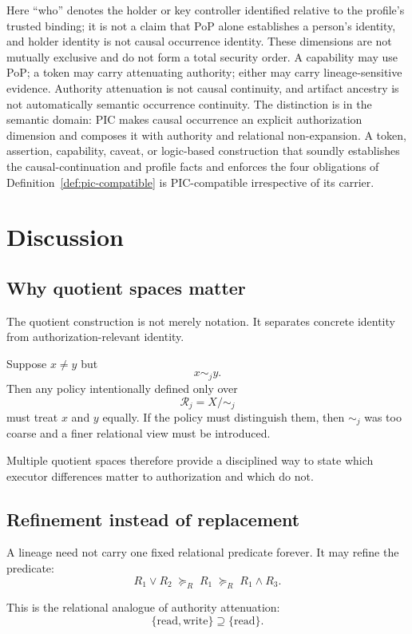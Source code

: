 \documentclass[10pt,twocolumn]{article}
\newcommand{\Rel}{\mathcal{R}}
\begin{document}
Here ``who'' denotes the holder or key controller identified relative to the
profile's trusted binding; it is not a claim that PoP alone establishes a
person's identity, and holder identity is not causal occurrence identity.
These dimensions are not mutually exclusive and do not form a total security
order. A capability may use PoP; a token may carry attenuating authority; either
may carry lineage-sensitive evidence. Authority attenuation is not causal
continuity, and artifact ancestry is not automatically semantic occurrence
continuity. The distinction is in the
semantic domain: PIC makes causal occurrence an explicit authorization
dimension and composes it with authority and relational non-expansion. A token,
assertion, capability, caveat, or logic-based construction that soundly
establishes the causal-continuation and profile facts and enforces the four
obligations of Definition~\ref{def:pic-compatible} is PIC-compatible
irrespective of its carrier.

\section{Discussion}

\subsection{Why quotient spaces matter}

The quotient construction is not merely notation. It separates concrete
identity from authorization-relevant identity.

Suppose \(x\neq y\) but
\[
x\sim_j y.
\]
Then any policy intentionally defined only over
\[
\Rel_j=X/{\sim_j}
\]
must treat \(x\) and \(y\) equally. If the policy must distinguish them, then
\(\sim_j\) was too coarse and a finer relational view must be introduced.

Multiple quotient spaces therefore provide a disciplined way to state which
executor differences matter to authorization and which do not.

\subsection{Refinement instead of replacement}

A lineage need not carry one fixed relational predicate forever. It may refine
the predicate:
\[
R_1\lor R_2
\;\succeq_R\;
R_1
\;\succeq_R\;
R_1\land R_3.
\]

This is the relational analogue of authority attenuation:
\[
\{\text{read},\text{write}\}
\supseteq
\{\text{read}\}.
\]
\end{document}
